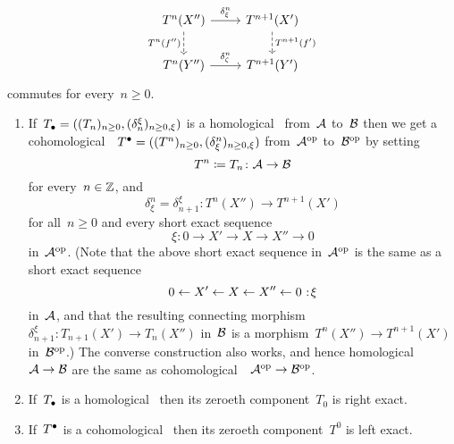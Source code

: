 \begin{definition}
\begin{enumerate}
\begin{enumerate}[label=(C$\delta$\arabic*)]
          \[
            \begin{tikzcd}
                T^n(X'')
                \arrow{r}[above]{\delta_\xi^n}
                \arrow[dashed]{d}[left]{T^n(f'')}
              & T^{n+1}(X')
                \arrow[dashed]{d}[right]{T^{n+1}(f')}
              \\
                T^n(Y'')
                \arrow{r}[above]{\delta_\zeta^n}
              & T^{n+1}(Y')
            \end{tikzcd}
          \]
          commutes for every~$n \geq 0$.
      \end{enumerate}
  \end{enumerate}
\end{definition}


\begin{remark}
  \leavevmode
  \begin{enumerate}
    \item
      If~$T_\bullet = ((T_n)_{n \geq 0}, (\delta_n^\xi)_{n \geq 0, \xi})$ is a homological~{\deltafun} from~$\mathcal{A}$ to~$\mathcal{B}$ then we get a cohomological~{\deltafun}~$T^\bullet = ((T^n)_{n \geq 0}, (\delta_\xi^n)_{n \geq 0, \xi})$ from~$\mathcal{A}^{\mathrm{op}}$ to~$\mathcal{B}^{\mathrm{op}}$ by setting
      \[
                  T^n
        \coloneqq  T_n
        \colon    \mathcal{A}
        \to       \mathcal{B}
      \]
      for every~$n \in \mathbb{Z}$, and
      \[
                \delta_\xi^n
        =       \delta^\xi_{n+1}
        \colon  T^n(X'')
        \to     T^{n+1}(X')
      \]
      for all~$n \geq 0$ and every short exact sequence
      \[
        \xi
        \colon
        0
        \to
        X'
        \to
        X
        \to
        X''
        \to
        0
      \]
      in~$\mathcal{A}^{\mathrm{op}}$.
      (Note that the above short exact sequence in~$\mathcal{A}^{\mathrm{op}}$ is the same as a short exact sequence
      \[
        0
        \from
        X'
        \from
        X
        \from
        X''
        \from
        0
        \cocolon
        \xi
      \]
      in~$\mathcal{A}$, and that the resulting connecting morphism~$\delta^\xi_{n+1} \colon T_{n+1}(X') \to T_n(X'')$ in~$\mathcal{B}$ is a morphism~$T^n(X'') \to T^{n+1}(X')$ in~$\mathcal{B}^{\mathrm{op}}$.)
      The converse construction also works, and hence homological~{\deltafuns}~$\mathcal{A} \to \mathcal{B}$ are the same as cohomological~{\deltafuns}~$\mathcal{A}^{\mathrm{op}} \to \mathcal{B}^{\mathrm{op}}$.
    \item
      If~$T_\bullet$ is a homological~{\deltafun} then its zeroeth component~$T_0$ is right exact.
    \item
      If~$T^\bullet$ is a cohomological~{\deltafun} then its zeroeth component~$T^0$ is left exact.
  \end{enumerate}
\end{remark}


